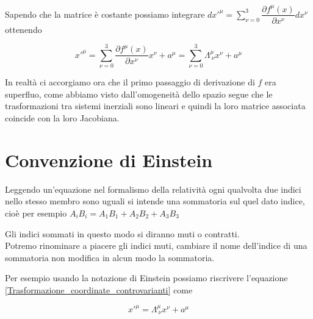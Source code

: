 \documentclass[12pt,a4paper,titlepage, twoside, openright]{book}
\numberwithin{equation}{chapter}
\begin{document}
Sapendo che la matrice è costante possiamo integrare $dx'^\mu= \sum_{\nu=0}^{3} \dfrac{\partial f^\mu (x)}{\partial x^\nu} dx^\nu$ ottenendo

\begin{equation}\label{Trasformazione_coordinate_controvarianti}
x'^\mu = \sum_{\nu=0}^{3} \dfrac{\partial f^\mu (x)}{\partial x^\nu} x^\nu + a^\mu = \sum_{\nu=0}^{3} \Lambda^\mu_{\> \nu} x^\nu + a^\mu
\end{equation}

In realtà ci accorgiamo ora che il primo passaggio di derivazione di $f$ era superfluo, come abbiamo visto dall'omogeneità dello spazio segue che le trasformazioni tra sistemi inerziali sono lineari e quindi la loro matrice associata coincide con la loro Jacobiana.

\section{Convenzione di Einstein}\label{sezConvenzioneIndici}
Leggendo un'equazione nel formalismo della relatività ogni qualvolta due indici nello stesso membro sono uguali si intende una sommatoria sul quel dato indice, cioè per esempio $A_ iB_i=A_1B_1+A_2B_2+A_3B_3$

Gli indici sommati in questo modo si diranno muti o contratti. \\
Potremo rinominare a piacere gli indici muti, cambiare il nome dell'indice di una sommatoria non modifica in alcun modo la sommatoria.

Per esempio usando la notazione di Einstein possiamo riscrivere l'equazione \eqref{Trasformazione_coordinate_controvarianti} come

\begin{equation}\label{Trasformazione_coordinate_controvarianti_Einstein}
x'^\mu = \Lambda^\mu_{\> \nu} x^\nu + a^\mu
\end{equation}
\end{document}

